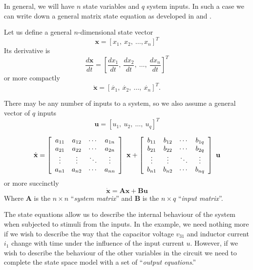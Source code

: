 \fi
In general, we will have $n$ state variables and $q$ system
inputs. In such a case we can write down a general matrix state
equation as developed in  and .
\begin{slide}\label{slides:l13s3}
 Let us define a general
$n$-dimensional state vector
\[\mathbf{x} = \left[x_1,\ x_2,\ \ldots, x_n\right]^T\] Its
derivative is
\[\frac{d\mathbf{x}}{dt} = \left[\frac{dx_1}{dt},\ \frac{dx_2}{dt},\
\ldots,\
\frac{dx_n}{dt}\right]^T\] or more compactly
\[\dot{\mathbf{x}}=\left[\dot{x_1},\ \dot{x_2},\ \ldots,\
\dot{x_n}\right]^T.\]

There may be any number of inputs to a system, so we also assume a
general vector of $q$ inputs
\[\mathbf{u}=\left[u_1,\ u_2,\ \ldots,\ u_q\right]^T\]
\end{slide}

\begin{slide}\label{slides:l13s4}
\[
\dot{\mathbf{x}}=\left[\begin{array}{cccc}
  a_{11} & a_{12} & \cdots & a_{1n} \\
  a_{21} & a_{22} & \cdots & a_{2n} \\
  \vdots & \vdots & \ddots & \vdots \\
  a_{n1} & a_{n2} & \cdots & a_{nn}
\end{array}\right]\ \mathbf{x} + \left[\begin{array}{cccc}
  b_{11} & b_{12} & \cdots & b_{1q} \\
  b_{21} & b_{22} & \cdots & b_{2q} \\
  \vdots & \vdots & \ddots & \vdots \\
  b_{n1} & b_{n2} & \cdots & b_{nq}
\end{array}\right]\ \mathbf{u} \\
\]
or more succinctly
\[
\dot{\mathbf{x}}=\mathbf{A}\mathbf{x}+\mathbf{B}\mathbf{u}
\]
Where $\mathbf{A}$ is the $n\times n$ ``\emph{system matrix}'' and
$\mathbf{B}$ is the $n\times q$ ``\emph{input matrix}''.
\end{slide}


The state equations allow us to describe the internal behaviour of
the system when subjected to stimuli from the inputs. In the
example, we need nothing more if we wish to describe the way that
the capacitor voltage $v_{31}$ and inductor current $i_1$ change
with time under the influence of the input current $u$. However,
if we wish to describe the behaviour of the other variables in the
circuit we need to complete the state space model with a set of
``\emph{output equations}.''

